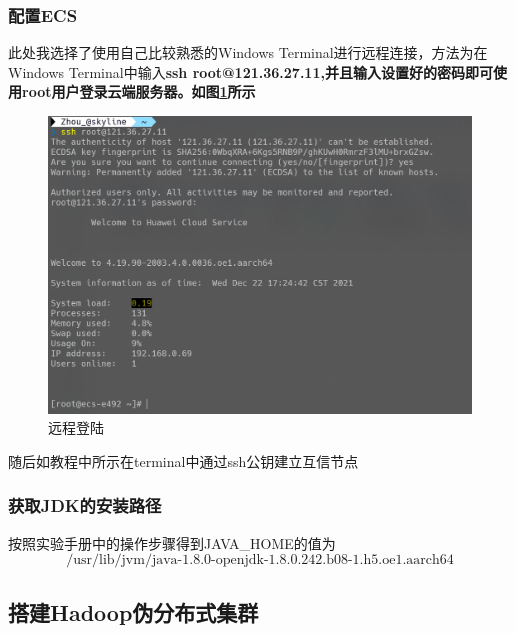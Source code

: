 \documentclass{../source/zjureport}
\begin{document}
            \subsubsection{配置ECS}
                此处我选择了使用自己比较熟悉的Windows Terminal进行远程连接，方法为在Windows Terminal中输入\bf{ssh root@121.36.27.11},并且输入设置好的密码即可使用root用户登录云端服务器。如图\ref{远程连接}所示
                \begin{figure}[H]
                    \centering
                    \includegraphics[width = \textwidth]{figure/远程登陆.png}
                    \caption{远程登陆}
                    \label{远程连接}
                \end{figure}

                随后如教程中所示在terminal中通过ssh公钥建立互信节点

            \subsubsection{获取JDK的安装路径}
                按照实验手册中的操作步骤得到JAVA_HOME的值为
                $$\text{/usr/lib/jvm/java-1.8.0-openjdk-1.8.0.242.b08-1.h5.oe1.aarch64}$$

        \subsection{搭建Hadoop伪分布式集群}
\end{document}
